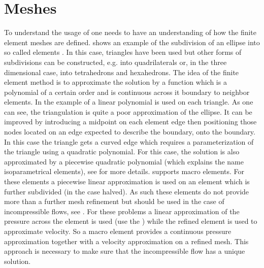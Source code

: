 \section{Meshes}
\label{FINLEY MESHES}
To understand the usage of \finley one needs to have an understanding of how the finite element meshes
 are defined.  shows an example of the
subdivision of an ellipse into so called elements  .
In this case, triangles have been used but other forms of subdivisions
can be constructed, e.g. into quadrilaterals or, in the three dimensional case, into tetrahedrons
and hexahedrons. The idea of the finite element method is to approximate the solution by a function
which is a polynomial of a certain order and is continuous across it boundary to neighbor elements.
In the example of  a linear polynomial is used on each triangle. As one can see, the triangulation
is quite a poor approximation of the ellipse. It can be improved by introducing a midpoint on each element edge then
positioning those nodes located on an edge expected to describe the boundary, onto the boundary.
In this case the triangle gets a curved edge which requires a parameterization of the triangle using a
quadratic polynomial. For this case, the solution is also approximated by a piecewise quadratic polynomial
(which explains the name isoparametrical elements), see  for more details.
\finley supports macro elements. For these elements a piecewise linear approximation is used on an element which is further subdivided (in the case \finley halved). As such these elements do not provide more than a further mesh refinement but should be used in the case of incompressible flows, see . For these problems a linear approximation of the pressure across the element is used (use the \ReducedSolutionFS \FunctionSpace) while the refined element is used to approximate velocity. So a macro element provides a continuous pressure approximation together with a velocity approximation on a refined mesh. This approach is necessary to make sure that the  incompressible flow has a unique solution.

